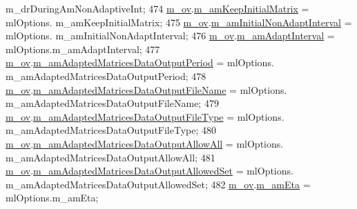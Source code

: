 \begin{DoxyCode}
      m\_drDuringAmNonAdaptiveInt;
474   \hyperlink{class_q_u_e_s_o_1_1_metropolis_hastings_s_g_options_a9d4792d9fc2dc5439b8ab489b0c236eb}{m\_ov}.\hyperlink{class_q_u_e_s_o_1_1_mh_options_values_a65b54138ec13a04d67a75a03f6300132}{m\_amKeepInitialMatrix}                       = mlOptions.
      m\_amKeepInitialMatrix;
475   \hyperlink{class_q_u_e_s_o_1_1_metropolis_hastings_s_g_options_a9d4792d9fc2dc5439b8ab489b0c236eb}{m\_ov}.\hyperlink{class_q_u_e_s_o_1_1_mh_options_values_a3e72af53780ce9420c3454b00f56bc11}{m\_amInitialNonAdaptInterval}                 = mlOptions.
      m\_amInitialNonAdaptInterval;
476   \hyperlink{class_q_u_e_s_o_1_1_metropolis_hastings_s_g_options_a9d4792d9fc2dc5439b8ab489b0c236eb}{m\_ov}.\hyperlink{class_q_u_e_s_o_1_1_mh_options_values_a5cda43f7f5361c56eab4c036c9bcab5d}{m\_amAdaptInterval}                           = mlOptions.m\_amAdaptInterval;
477   \hyperlink{class_q_u_e_s_o_1_1_metropolis_hastings_s_g_options_a9d4792d9fc2dc5439b8ab489b0c236eb}{m\_ov}.\hyperlink{class_q_u_e_s_o_1_1_mh_options_values_a9e9de50014cce9683774d42119a1b752}{m\_amAdaptedMatricesDataOutputPeriod}         = mlOptions.
      m\_amAdaptedMatricesDataOutputPeriod;
478   \hyperlink{class_q_u_e_s_o_1_1_metropolis_hastings_s_g_options_a9d4792d9fc2dc5439b8ab489b0c236eb}{m\_ov}.\hyperlink{class_q_u_e_s_o_1_1_mh_options_values_ad131a1b5617e040b7602fbd6bf4a600e}{m\_amAdaptedMatricesDataOutputFileName}       = mlOptions.
      m\_amAdaptedMatricesDataOutputFileName;
479   \hyperlink{class_q_u_e_s_o_1_1_metropolis_hastings_s_g_options_a9d4792d9fc2dc5439b8ab489b0c236eb}{m\_ov}.\hyperlink{class_q_u_e_s_o_1_1_mh_options_values_a2aeb0e38d87c86464af4bde6a202598a}{m\_amAdaptedMatricesDataOutputFileType}       = mlOptions.
      m\_amAdaptedMatricesDataOutputFileType;
480   \hyperlink{class_q_u_e_s_o_1_1_metropolis_hastings_s_g_options_a9d4792d9fc2dc5439b8ab489b0c236eb}{m\_ov}.\hyperlink{class_q_u_e_s_o_1_1_mh_options_values_aa149885c0a566a853626ddae4a31f313}{m\_amAdaptedMatricesDataOutputAllowAll}       = mlOptions.
      m\_amAdaptedMatricesDataOutputAllowAll;
481   \hyperlink{class_q_u_e_s_o_1_1_metropolis_hastings_s_g_options_a9d4792d9fc2dc5439b8ab489b0c236eb}{m\_ov}.\hyperlink{class_q_u_e_s_o_1_1_mh_options_values_a5e9c6606269be17f3f7627f1b065b864}{m\_amAdaptedMatricesDataOutputAllowedSet}     = mlOptions.
      m\_amAdaptedMatricesDataOutputAllowedSet;
482   \hyperlink{class_q_u_e_s_o_1_1_metropolis_hastings_s_g_options_a9d4792d9fc2dc5439b8ab489b0c236eb}{m\_ov}.\hyperlink{class_q_u_e_s_o_1_1_mh_options_values_ac901ea79ba9b77aae31e3ea07df140b1}{m\_amEta}                                     = mlOptions.m\_amEta;

\end{DoxyCode}
